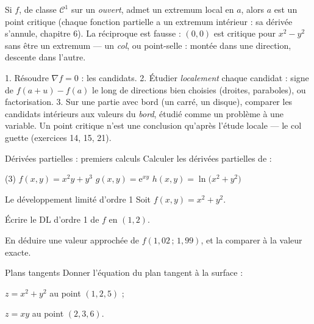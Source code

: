 \begin{theoreme}
Si $f$, de classe $\mathcal{C}^{1}$ sur un \emph{ouvert}, admet un
extremum local en $a$, alors $a$ est un point critique (chaque fonction
partielle a un extremum intérieur : sa dérivée s'annule, chapitre 6). La
réciproque est fausse : $(0,0)$ est critique pour $x^{2}-y^{2}$ sans être
un extremum — un \emph{col}, ou point-selle : montée dans une direction,
descente dans l'autre.
\end{theoreme}

\begin{savoirfaire}
1. Résoudre $\nabla f=0$ : les candidats. 2. Étudier \emph{localement}
chaque candidat : signe de $f(a+u)-f(a)$ le long de directions bien
choisies (droites, paraboles), ou factorisation. 3. Sur une partie avec
bord (un carré, un disque), comparer les candidats intérieurs aux valeurs
du \emph{bord}, étudié comme un problème à une variable. Un point
critique n'est une conclusion qu'après l'étude locale — le col guette
(exercices 14, 15, 21).
\end{savoirfaire}

\exercices
{}

\begin{exercice}[1]{Dérivées partielles : premiers calculs}
Calculer les dérivées partielles de :
\begin{tasks}(3)
  \task $f(x,y)=x^{2}y+y^{3}$
  \task $g(x,y)=\mathrm{e}^{xy}$
  \task $h(x,y)=\ln\bigl(x^{2}+y^{2}\bigr)$
\end{tasks}
\end{exercice}

\begin{exercice}[1]{Le développement limité d'ordre 1}
Soit $f(x,y)=x^{2}+y^{2}$.
\begin{questions}
  \item Écrire le DL d'ordre 1 de $f$ en $(1,2)$.
  \item En déduire une valeur approchée de $f(1{,}02\,;\,1{,}99)$, et la
    comparer à la valeur exacte.
\end{questions}
\end{exercice}

\begin{exercice}[1]{Plans tangents}
Donner l'équation du plan tangent à la surface :
\begin{questions}
  \item $z=x^{2}+y^{2}$ au point $(1,2,5)$ ;
  \item $z=xy$ au point $(2,3,6)$.
\end{questions}
\end{exercice}

